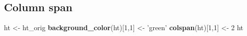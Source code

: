 \documentclass[]{article}
\newenvironment{Shaded}{\begin{snugshade}}{\end{snugshade}}
\newcommand{\KeywordTok}[1]{\textcolor[rgb]{0.13,0.29,0.53}{\textbf{{#1}}}}
\newcommand{\DecValTok}[1]{\textcolor[rgb]{0.00,0.00,0.81}{{#1}}}
\newcommand{\StringTok}[1]{\textcolor[rgb]{0.31,0.60,0.02}{{#1}}}
\newcommand{\NormalTok}[1]{{#1}}
\begin{document}
\FloatBarrier

\subsection{Column span}\label{column-span}

\begin{Shaded}
\begin{Highlighting}[]
\NormalTok{ht <-}\StringTok{ }\NormalTok{ht_orig}
\KeywordTok{background_color}\NormalTok{(ht)[}\DecValTok{1}\NormalTok{,}\DecValTok{1}\NormalTok{] <-}\StringTok{ 'green'}
\KeywordTok{colspan}\NormalTok{(ht)[}\DecValTok{1}\NormalTok{,}\DecValTok{1}\NormalTok{] <-}\StringTok{ }\DecValTok{2}
\NormalTok{ht   }
\end{Highlighting}
\end{Shaded}
\end{document}
